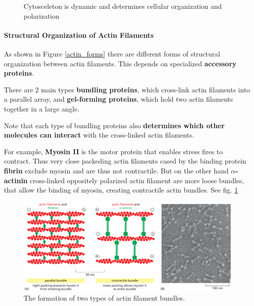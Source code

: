 \documentclass[../main.tex]{subfiles}
\begin{document}
\begin{figure}[H]
	\centering
	\caption{Cytosceleton is dynamic and determines cellular organization and polarization}
\end{figure}

\paragraph{Structural Organization of Actin Filaments}
As shown in Figure \ref{actin_forms} there are different forms of structural organization between actin filaments. This depends on specialized \textbf{accessory proteins}. 

There are 2 main types \textbf{bundling proteins}, which cross-link actin filaments into a parallel array, and \textbf{gel-forming proteins}, which hold two actin filaments together in a large angle. 

Note that each type of bundling proteins also \textbf{determines which other molecules can interact} with the cross-linked actin filaments. 

For example, \textbf{Myosin II} is the motor protein that enables stress fires to contract. Thus very close packeding actin filaments cased by the binding protein \textbf{fibrin} exclude myosin and are thus not contractile. But on the other hand \textbf{$\alpha$-actinin} cross-linked oppositely polarized actin filament are more loose bundles, that allow the binding of myosin, creating contractile actin bundles.  See fig. \ref{myosine-boundels}

\begin{figure}[H]
	\centering
	\includegraphics[width = 0.7 \textwidth]{14}
	\caption{The formation of two types of actin filament bundles.}
	\label{myosine-boundels}
\end{figure}
\end{document}
